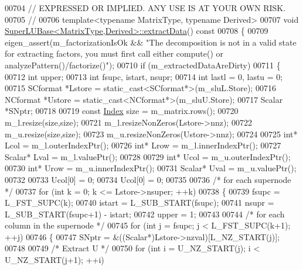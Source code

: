 \begin{DoxyCode}
00704 \textcolor{comment}{//  EXPRESSED OR IMPLIED.  ANY USE IS AT YOUR OWN RISK.}
00705 \textcolor{comment}{//}
00706 \textcolor{keyword}{template}<\textcolor{keyword}{typename} MatrixType, \textcolor{keyword}{typename} Derived>
00707 \textcolor{keywordtype}{void} \hyperlink{class_eigen_1_1_super_l_u_base}{SuperLUBase<MatrixType,Derived>::extractData}()\textcolor{keyword}{ const}
00708 \textcolor{keyword}{}\{
00709   eigen\_assert(m\_factorizationIsOk && \textcolor{stringliteral}{"The decomposition is not in a valid state for extracting factors,
       you must first call either compute() or analyzePattern()/factorize()"});
00710   \textcolor{keywordflow}{if} (m\_extractedDataAreDirty)
00711   \{
00712     \textcolor{keywordtype}{int}         upper;
00713     \textcolor{keywordtype}{int}         fsupc, istart, nsupr;
00714     \textcolor{keywordtype}{int}         lastl = 0, lastu = 0;
00715     SCformat    *Lstore = \textcolor{keyword}{static\_cast<}SCformat*\textcolor{keyword}{>}(m\_sluL.Store);
00716     NCformat    *Ustore = \textcolor{keyword}{static\_cast<}NCformat*\textcolor{keyword}{>}(m\_sluU.Store);
00717     Scalar      *SNptr;
00718 
00719     \textcolor{keyword}{const} \hyperlink{namespace_eigen_a62e77e0933482dafde8fe197d9a2cfde}{Index} size = m\_matrix.rows();
00720     m\_l.resize(size,size);
00721     m\_l.resizeNonZeros(Lstore->nnz);
00722     m\_u.resize(size,size);
00723     m\_u.resizeNonZeros(Ustore->nnz);
00724 
00725     \textcolor{keywordtype}{int}* Lcol = m\_l.outerIndexPtr();
00726     \textcolor{keywordtype}{int}* Lrow = m\_l.innerIndexPtr();
00727     Scalar* Lval = m\_l.valuePtr();
00728 
00729     \textcolor{keywordtype}{int}* Ucol = m\_u.outerIndexPtr();
00730     \textcolor{keywordtype}{int}* Urow = m\_u.innerIndexPtr();
00731     Scalar* Uval = m\_u.valuePtr();
00732 
00733     Ucol[0] = 0;
00734     Ucol[0] = 0;
00735 
00736     \textcolor{comment}{/* for each supernode */}
00737     \textcolor{keywordflow}{for} (\textcolor{keywordtype}{int} k = 0; k <= Lstore->nsuper; ++k)
00738     \{
00739       fsupc   = L\_FST\_SUPC(k);
00740       istart  = L\_SUB\_START(fsupc);
00741       nsupr   = L\_SUB\_START(fsupc+1) - istart;
00742       upper   = 1;
00743 
00744       \textcolor{comment}{/* for each column in the supernode */}
00745       \textcolor{keywordflow}{for} (\textcolor{keywordtype}{int} j = fsupc; j < L\_FST\_SUPC(k+1); ++j)
00746       \{
00747         SNptr = &((Scalar*)Lstore->nzval)[L\_NZ\_START(j)];
00748 
00749         \textcolor{comment}{/* Extract U */}
00750         \textcolor{keywordflow}{for} (\textcolor{keywordtype}{int} i = U\_NZ\_START(j); i < U\_NZ\_START(j+1); ++i)

\end{DoxyCode}
